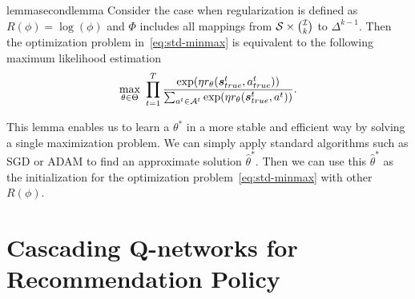 \documentclass{article} %
\newcommand{\Le}[1]{{\color{red}{\bf\sf [ #1]}}}
\newcommand{\xc}[1]{{\color{blue}{\bf\sf [#1]}}}
\begin{document}
\begin{restatable}{lemma}{secondlemma}\label{lm2:mle}
Consider the case when regularization is defined as $R(\phi) = \log(\phi)$ and $\Phi$ includes all mappings from ${\mathcal{S}} \times {{\mathcal{I}}\choose k}$ to $\Delta^{k-1}$. Then the optimization problem in~\eqref{eq:std-minmax} is equivalent to the following maximum likelihood estimation
{\small \begin{equation}\label{eq:mle}
	\max_{\theta \in \Theta}~\prod_{t=1}^T \dfrac{\exp(\eta r_{\theta}({\bm{s}}_{true}^t, a^t_{true}))}{\sum_{a^t \in {\mathcal{A}}^t}\exp(\eta r_{\theta}({\bm{s}}_{true}^t, a^t))}.
\end{equation}}
 \end{restatable}
This lemma enables us to learn a $\theta^*$ in a more stable and efficient way by solving a single maximization problem. We can simply apply standard algorithms such as SGD or ADAM to find an approximate solution $\hat{\theta}^*$. Then we can use this $\hat{\theta}^*$ as the initialization for the optimization problem~\eqref{eq:std-minmax} with other $R(\phi)$.   

\vspace{-3mm}
\section{Cascading Q-networks for Recommendation Policy}
\vspace{-3mm}
\end{document}
